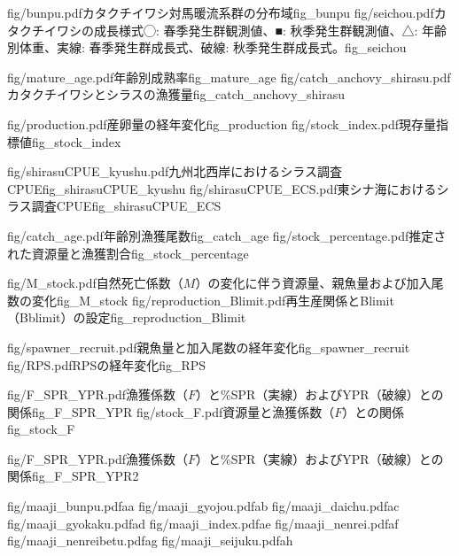 \TwoOfSixFigs
{fig/bunpu.pdf}{カタクチイワシ対馬暖流系群の分布域}{fig_bunpu}
{fig/seichou.pdf}{カタクチイワシの成長様式\newline◯: 春季発生群観測値、■: 秋季発生群観測値、△: 年齢別体重、実線: 春季発生群成長式、破線: 秋季発生群成長式。}{fig_seichou}

\TwoOfSixFigs
{fig/mature_age.pdf}{年齢別成熟率}{fig_mature_age}
{fig/catch_anchovy_shirasu.pdf}{カタクチイワシとシラスの漁獲量}{fig_catch_anchovy_shirasu}

\TwoOfSixFigs
{fig/production.pdf}{産卵量の経年変化}{fig_production}
{fig/stock_index.pdf}{現存量指標値}{fig_stock_index}

\TwoOfSixFigs
{fig/shirasuCPUE_kyushu.pdf}{九州北西岸におけるシラス調査CPUE}{fig_shirasuCPUE_kyushu}
{fig/shirasuCPUE_ECS.pdf}{東シナ海におけるシラス調査CPUE}{fig_shirasuCPUE_ECS}

\TwoOfSixFigs
{fig/catch_age.pdf}{年齢別漁獲尾数}{fig_catch_age}
{fig/stock_percentage.pdf}{推定された資源量と漁獲割合}{fig_stock_percentage}

\TwoOfSixFigs
{fig/M_stock.pdf}{自然死亡係数（$M$）の変化に伴う資源量、親魚量および加入尾数の変化}{fig_M_stock}
{fig/reproduction_Blimit.pdf}{再生産関係とBlimit（Bblimit）の設定}{fig_reproduction_Blimit}

\TwoOfSixFigs
{fig/spawner_recruit.pdf}{親魚量と加入尾数の経年変化}{fig_spawner_recruit}
{fig/RPS.pdf}{RPSの経年変化}{fig_RPS}

\TwoOfSixFigs
{fig/F_SPR_YPR.pdf}{漁獲係数（$F$）と\%SPR（実線）およびYPR（破線）との関係}{fig_F_SPR_YPR}
{fig/stock_F.pdf}{資源量と漁獲係数（$F$）との関係}{fig_stock_F}

\OneOfSixFigs
{fig/F_SPR_YPR.pdf}{漁獲係数（$F$）と\%SPR（実線）およびYPR（破線）との関係}{fig_F_SPR_YPR2}


\TwoOfEightFigs
{fig/maaji_bunpu.pdf}{a}{a}
{fig/maaji_gyojou.pdf}{a}{b}
\TwoOfEightFigs
{fig/maaji_daichu.pdf}{a}{c}
{fig/maaji_gyokaku.pdf}{a}{d}
\TwoOfEightFigs
{fig/maaji_index.pdf}{a}{e}
{fig/maaji_nenrei.pdf}{a}{f}
\TwoOfEightFigs
{fig/maaji_nenreibetu.pdf}{a}{g}
{fig/maaji_seijuku.pdf}{a}{h}
